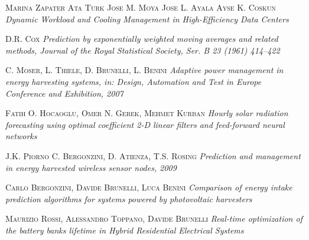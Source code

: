 \begin{thebibliography}{99}

 \textsc{Marina Zapater Ata Turk Jose M. Moya Jose L. Ayala Ayse K. Coskun}
 \textit{Dynamic Workload and Cooling Management in High-Efficiency Data Centers}

 \textsc{D.R. Cox} \textit{Prediction by exponentially weighted moving averages and related methods, Journal of the Royal Statistical Society, Ser. B 23 (1961) 414–422}

 \textsc{C. Moser, L. Thiele, D. Brunelli, L. Benini} \textit{Adaptive power management in energy harvesting systems, in: Design, Automation and Test in Europe Conference and Exhibition, 2007}

 \textsc{Fatih O. Hocaoglu, Omer N. Gerek, Mehmet Kurban} \textit{Hourly solar radiation forecasting using optimal coefficient 2-D linear filters and feed-forward neural networks}

 \textsc{J.K. Piorno C. Bergonzini, D. Atienza, T.S. Rosing} \textit{Prediction and management in energy harvested wireless sensor nodes, 2009}

 \textsc{Carlo Bergonzini, Davide Brunelli, Luca Benini} \textit{Comparison of energy intake prediction algorithms for systems powered by photovoltaic harvesters}

 \textsc{Maurizio Rossi, Alessandro Toppano, Davide Brunelli} \textit{Real-time optimization of the battery banks lifetime in Hybrid Residential Electrical Systems}

\end{thebibliography}

